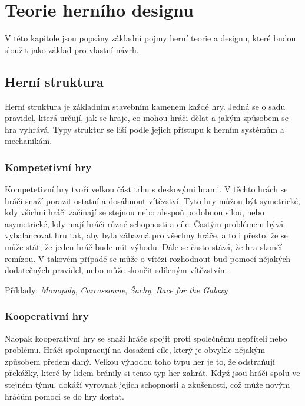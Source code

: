 \chapter{Teorie herního designu}
\label{chap:game_design}

V této kapitole jsou popsány základní pojmy herní teorie a designu, které budou sloužit jako základ pro vlastní návrh. \cite{building_blocks_of_tabletop_design_2022}



\section{Herní struktura}
\label{sec:structure}

Herní struktura je základním stavebním kamenem každé hry. Jedná se o sadu pravidel, která určují, jak se hraje, co mohou hráči dělat a jakým způsobem se hra vyhrává. Typy struktur se liší podle jejich přístupu k herním systémům a mechanikám. 

\subsection{Kompetetivní hry}
\label{subsec:competitive}

Kompetetivní hry tvoří velkou část trhu s deskovými hrami. V těchto hrách se hráči snaží porazit ostatní a dosáhnout vítězství. Tyto hry můžou být symetrické, kdy všichni hráči začínají se stejnou nebo alespoň podobnou silou, nebo asymetrické, kdy mají hráči různé schopnosti a cíle. Častým problémem bývá vybalancovat hru tak, aby byla zábavná pro všechny hráče, a to i přesto, že se může stát, že jeden hráč bude mít výhodu. Dále se často stává, že hra skončí remízou. V takovém případě se může o vítězi rozhodnout buď pomocí nějakých dodatečných pravidel, nebo může skončit sdíleným vítězstvím.

Příklady: \textit{Monopoly}, \textit{Carcassonne}, \textit{Šachy}, \textit{Race for the Galaxy}

\subsection{Kooperativní hry}
\label{subsec:cooperative}

Naopak kooperativní hry se snaží hráče spojit proti společnému nepříteli nebo problému. Hráči spolupracují na dosažení cíle, který je obvykle nějakým způsobem předem daný. Velkou výhodou toho typu her je to, že odstraňují překážky, které by lidem bránily si tento typ her zahrát. Když jsou hráči spolu ve stejném týmu, dokáží vyrovnat jejich schopnosti a zkušenosti, což může novým hráčům pomoci se do hry dostat.

